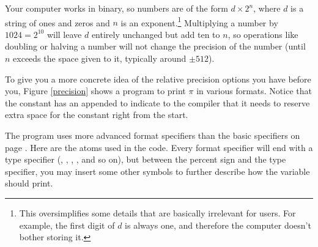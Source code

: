 Your computer works in binary, so numbers are of the form $d \times
2^n$, where $d$ is a string of ones and zeros and $n$ is an
exponent.\footnote{This oversimplifies some details that are
basically irrelevant for users. For example, the first digit of $d$
is always one, and therefore the computer doesn't bother storing it.}
Multiplying a number by $1024=2^{10}$ will leave $d$ entirely unchanged
but add ten to $n$, so operations like doubling or halving a number
will not change the precision of the number (until $n$ exceeds the space
given to it, typically around $\pm 512$).

To give you a more concrete idea of the relative precision options
you have before you, Figure \ref{precision} shows a program to print $\pi$ in various
formats. Notice that the constant has an  appended to indicate
to the compiler that it needs to reserve extra space for the constant
right from the start. 

The program uses more advanced format specifiers than the basic specifiers
on page \pageref{printf}. Here are the atoms used in the code.  Every
format specifier will end with a type specifier (, , ,
, and so on), but between the percent sign and the type specifier,
you may insert some other symbols to further describe how the variable
should print.

\begin{center}
\label{printftwo}
\end{center}


